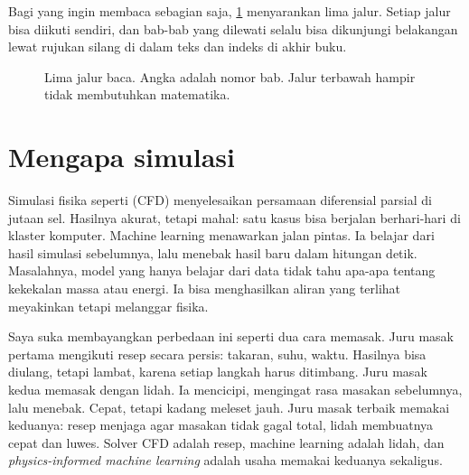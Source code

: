 Bagi yang ingin membaca sebagian saja, \cref{fig:jalur} menyarankan lima jalur. Setiap jalur bisa diikuti sendiri, dan bab-bab yang
dilewati selalu bisa dikunjungi belakangan lewat rujukan silang di dalam teks dan indeks di akhir buku.

\begin{figure}[ht]
\centering
{}
\caption{Lima jalur baca. Angka adalah nomor bab. Jalur terbawah hampir tidak membutuhkan matematika.}
\label{fig:jalur}
\end{figure}

\section{Mengapa simulasi}

Simulasi fisika seperti  (CFD) menyelesaikan persamaan
diferensial parsial di jutaan sel. Hasilnya akurat, tetapi mahal: satu kasus bisa berjalan
berhari-hari di klaster komputer. Machine learning menawarkan jalan pintas. Ia belajar dari
hasil simulasi sebelumnya, lalu menebak hasil baru dalam hitungan detik. Masalahnya, model yang
hanya belajar dari data tidak tahu apa-apa tentang kekekalan massa atau energi. Ia bisa
menghasilkan aliran yang terlihat meyakinkan tetapi melanggar fisika.

Saya suka membayangkan perbedaan ini seperti dua cara memasak. Juru masak pertama mengikuti
resep secara persis: takaran, suhu, waktu. Hasilnya bisa diulang, tetapi lambat, karena setiap
langkah harus ditimbang. Juru masak kedua memasak dengan lidah. Ia mencicipi, mengingat rasa
masakan sebelumnya, lalu menebak. Cepat, tetapi kadang meleset jauh. Juru masak terbaik memakai
keduanya: resep menjaga agar masakan tidak gagal total, lidah membuatnya cepat dan luwes. Solver
CFD adalah resep, machine learning adalah lidah, dan \emph{physics-informed machine learning}
adalah usaha memakai keduanya sekaligus.


